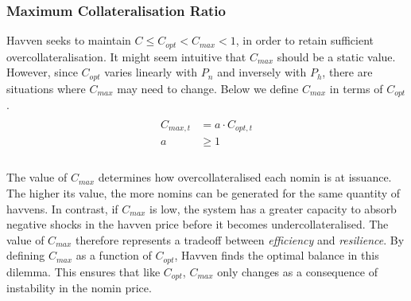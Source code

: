\newpage

\subsubsection{Maximum Collateralisation Ratio}

\noindent Havven seeks to maintain $C \leq C_{opt} < C_{max} < 1$, in order to retain sufficient overcollateralisation. It might seem intuitive that $C_{max}$ should be a static value. However, since $C_{opt}$ varies linearly with $P_n$ and inversely with $P_h$,  there are situations where $C_{max}$ may need to change. Below we define $C_{max}$ in terms of $C_{opt}$. \\

\begin{gather} \label{eq:maxcollateralisation}
\begin{align}
\begin{split}
C_{max,t} &=  a \cdot C_{opt,t} \\ 
a & \geq 1 \\
\end{split}
\end{align}
\end{gather}

\begin{center}
\end{center}

\noindent The value of $C_{max}$ determines how overcollateralised each nomin is at issuance. The higher its value, the more nomins can be generated for the same quantity of havvens. In contrast, if $C_{max}$ is low, the system has a greater capacity to absorb negative shocks in the havven price before it becomes undercollateralised.  The value of $C_{max}$ therefore represents a tradeoff between \textit{efficiency} and \textit{resilience}. By defining $C_{max}$ as a function of $C_{opt}$, Havven finds the optimal balance in this dilemma. This ensures that like $C_{opt}$, $C_{max}$ only changes as a consequence of instability in the nomin price. \\

